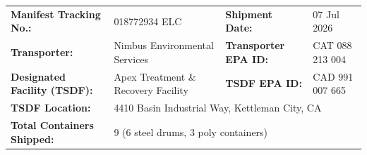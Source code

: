 
\newpage


\vspace{4pt}


\vspace{8pt}

\begin{tcolorbox}[infobox]
  \begin{tabularx}{\linewidth}{@{} l X l X @{}}
    \textbf{\textcolor{SlateInk}{Manifest Tracking No.:}}
    & 018772934 ELC
    & \textbf{\textcolor{SlateInk}{Shipment Date:}}
    & 07 Jul 2026 \\[2pt]
    \textbf{\textcolor{SlateInk}{Transporter:}}
    & Nimbus Environmental Services
    & \textbf{\textcolor{SlateInk}{Transporter EPA ID:}}
    & CAT 088 213 004 \\[2pt]
    \textbf{\textcolor{SlateInk}{Designated Facility (TSDF):}}
    & Apex Treatment \& Recovery Facility
    & \textbf{\textcolor{SlateInk}{TSDF EPA ID:}}
    & CAD 991 007 665 \\[2pt]
    \textbf{\textcolor{SlateInk}{TSDF Location:}}
    & \multicolumn{3}{l}{4410 Basin Industrial Way, Kettleman City, CA} \\[2pt]
    \textbf{\textcolor{SlateInk}{Total Containers Shipped:}}
    & \multicolumn{3}{l}{9 (6 steel drums, 3 poly containers)}
  \end{tabularx}
\end{tcolorbox}

\vspace{8pt}

